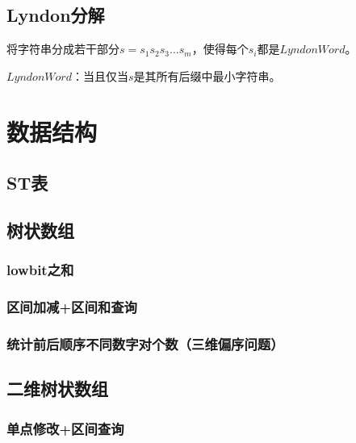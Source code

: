 \documentclass[landscape,twocolumn,twoside,a4paper]{article}
\begin{document}
\subsection{Lyndon分解}
将字符串分成若干部分$s = s_{1}s_{2}s_{3}...s_{m}$，使得每个$s_{i}$都是$Lyndon Word$。\par
$Lyndon Word$：当且仅当$s$是其所有后缀中最小字符串。



\section{数据结构}

\subsection{ST表}



\subsection{树状数组}

\subsubsection{lowbit之和}


\subsubsection{区间加减+区间和查询}


\subsubsection{统计前后顺序不同数字对个数（三维偏序问题）}



\subsection{二维树状数组}

\subsubsection{单点修改+区间查询}

\end{document}

